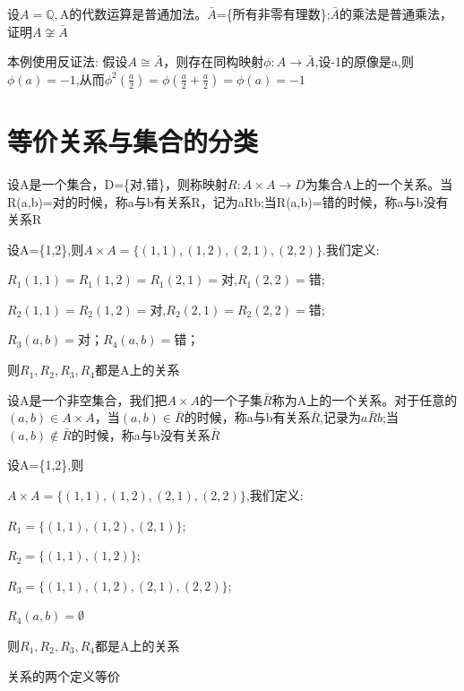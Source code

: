\documentclass[
	11pt, %
	fleqn, %
	a4paper, %
]{LegrandOrangeBook}
\begin{document}
\begin{example}
	设$A=\mathbb{Q},$A的代数运算是普通加法。$\bar{A}$=\{所有非零有理数\};$\bar{A}$的乘法是普通乘法，证明$A\not\cong \bar{A}$

	本例使用反证法:
	假设$A\cong\bar{A}$，则存在同构映射$\phi:A\rightarrow\bar{A}$,设-1的原像是a,则$\phi(a)=-1$,从而$\phi^{2}(\frac{a}{2})=\phi(\frac{a}{2}+\frac{a}{2})=\phi(a)=-1$
\end{example}
\section{等价关系与集合的分类}
\begin{definition}
	设A是一个集合，D=\{对,错\}，则称映射$R:A\times A\rightarrow D$为集合A上的一个关系。当R(a,b)=对的时候，称a与b有关系R，记为aRb;当R(a,b)=错的时候，称a与b没有关系R
\end{definition}
\begin{example}
	设A=\{1,2\},则$A\times A=\{(1,1),(1,2),(2,1),(2,2)\}$.我们定义:

	$R_1(1,1)=R_1(1,2)=R_1(2,1)=$对,$R_1(2,2)=$错;

	$R_2(1,1)=R_2(1,2)=$对,$R_2(2,1)=R_2(2,2)=$错;

	$R_3(a,b)=$对；$R_4(a,b)=$错；

	则$R_1,R_2,R_3,R_4$都是A上的关系
\end{example}

\begin{definition}
	设A是一个非空集合，我们把$A\times A$的一个子集$\bar{R}$称为A上的一个关系。对于任意的$(a,b)\in A\times A$，当$(a,b)\in\bar{R}$的时候，称a与b有关系$\bar{R}$,记录为$a\bar{R}b$;当$(a,b)\not\in\bar{R}$的时候，称a与b没有关系$\bar{R}$
\end{definition}

\begin{example}
	设A=\{1,2\},则

	$A\times A=\{(1,1),(1,2),(2,1),(2,2)\}$,我们定义:

	$R_1=\{(1,1),(1,2),(2,1)\}$;

	$R_2=\{(1,1),(1,2)\}$;

	$R_3=\{(1,1),(1,2),(2,1),(2,2)\}$;

	$R_4(a,b)=\emptyset$

	则$R_1,R_2,R_3,R_4$都是A上的关系
\end{example}

\begin{theorem}
	关系的两个定义等价
\end{theorem}
\end{document}

